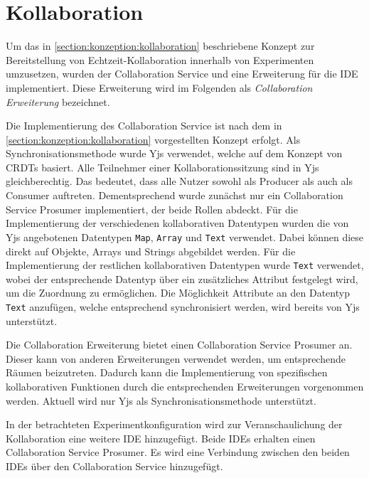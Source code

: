 \section{Kollaboration}\label{section:prototypische-implementierung:kollaboration}


Um das in \autoref{section:konzeption:kollaboration} beschriebene Konzept zur Bereitstellung von Echtzeit-Kollaboration innerhalb von Experimenten umzusetzen, wurden der Collaboration Service und eine Erweiterung für die IDE implementiert. Diese Erweiterung wird im Folgenden als \textit{Collaboration Erweiterung} bezeichnet.

Die Implementierung des Collaboration Service ist nach dem in \autoref{section:konzeption:kollaboration} vorgestellten Konzept erfolgt. Als Synchronisationsmethode wurde Yjs \cite{noauthor_yjs_nodate} verwendet, welche auf dem Konzept von \acp{CRDT} basiert. Alle Teilnehmer einer Kollaborationssitzung sind in Yjs gleichberechtig. Das bedeutet, dass alle Nutzer sowohl als Producer als auch als Consumer auftreten. Dementsprechend wurde zunächst nur ein Collaboration Service Prosumer implementiert, der beide Rollen abdeckt. Für die Implementierung der verschiedenen kollaborativen Datentypen wurden die von Yjs angebotenen Datentypen \texttt{Map}, \texttt{Array} und \texttt{Text} verwendet. Dabei können diese direkt auf Objekte, Arrays und Strings abgebildet werden. Für die Implementierung der restlichen kollaborativen Datentypen wurde \texttt{Text} verwendet, wobei der entsprechende Datentyp über ein zusätzliches Attribut festgelegt wird, um die Zuordnung zu ermöglichen. Die Möglichkeit Attribute an den Datentyp \texttt{Text} anzufügen, welche entsprechend synchronisiert werden, wird bereits von Yjs unterstützt.

Die Collaboration Erweiterung bietet einen Collaboration Service Prosumer an. Dieser kann von anderen Erweiterungen verwendet werden, um entsprechende Räumen beizutreten. Dadurch kann die Implementierung von spezifischen kollaborativen Funktionen durch die entsprechenden Erweiterungen vorgenommen werden. Aktuell wird nur Yjs als Synchronisationsmethode unterstützt.

In der betrachteten Experimentkonfiguration wird zur Veranschaulichung der Kollaboration eine weitere IDE hinzugefügt. Beide IDEs erhalten einen Collaboration Service Prosumer. Es wird eine Verbindung zwischen den beiden IDEs über den Collaboration Service hinzugefügt.